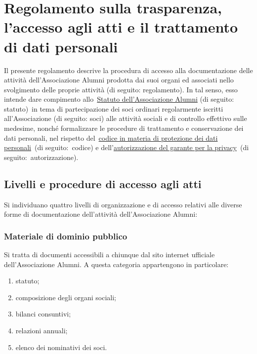 \section*{Regolamento sulla trasparenza, l'accesso agli atti e il trattamento
di dati personali}

Il presente regolamento descrive la procedura di accesso alla
documentazione delle attività dell’Associazione Alumni prodotta dai suoi
organi ed associati nello svolgimento delle proprie attività (di seguito:
regolamento). In tal senso, esso intende dare compimento
allo \href{http://www.alumniscuolagalileiana.it/wp-content/uploads/2017/03/Statuto-Alumni-SGSS.pdf}{Statuto
dell’Associazione Alumni} (di seguito: statuto) in tema di partecipazione
dei soci ordinari regolarmente iscritti all’Associazione (di seguito: soci)
alle attività sociali e di controllo effettivo sulle medesime, nonché
formalizzare le procedure di trattamento e conservazione dei dati
personali, nel rispetto del \href{http://www.garanteprivacy.it/web/guest/home/docweb/-/docweb-display/docweb/1311248}{codice in materia di protezione dei dati
personali}~(di seguito: codice) e dell’\href{http://garanteprivacy.it/web/guest/home/docweb/-/docweb-display/docweb/5803310}{autorizzazione del garante per la
privacy}~(di seguito: autorizzazione). 

\subsection{Livelli e procedure di accesso agli atti}

Si individuano quattro livelli di organizzazione e di accesso relativi alle
diverse forme di documentazione dell’attività dell’Associazione Alumni:

\subsubsection{Materiale di dominio pubblico}\label{materiale-di-dominio-pubblico}

Si tratta di documenti accessibili a chiunque dal sito internet ufficiale
dell’Associazione Alumni. A questa categoria appartengono in particolare: 
\begin{enumerate}
\item statuto;
\item composizione degli organi sociali;
\item bilanci consuntivi;
\item relazioni annuali;
\item elenco dei nominativi dei soci.
\end{enumerate}

